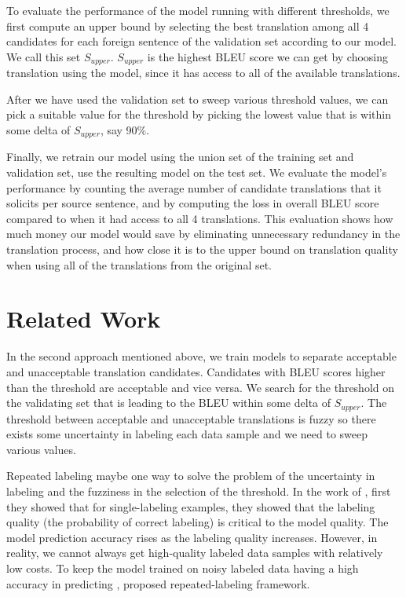 \documentclass[11pt]{article}
\begin{document}
To evaluate the performance of the model running with different thresholds, we first compute an upper bound by selecting the best translation among all 4 candidates for each foreign sentence of the validation set according to our  model. We call this set $S_{upper}$.  $S_{upper}$ is the highest BLEU score we can get by choosing translation using the model, since it has access to all of the available translations.  

After we have used the validation set to sweep various threshold values,  we can pick a suitable value for the threshold by picking the lowest value that is within some delta of $S_{upper}$, say  90$\%$. 

Finally, we retrain our model using the union set of the training set and validation set, use the resulting model on the test set.  We evaluate the model's performance by counting the average number of candidate translations that it solicits per source sentence, and by computing the loss in overall BLEU score compared to when it had access to all 4 translations.  This evaluation shows how much money our model would save by eliminating unnecessary redundancy in the translation process, and how close it is to the upper bound on translation quality when using all of the translations from the original set.

\section{Related Work}
In the second approach mentioned above, we train models to separate acceptable and unacceptable translation candidates. Candidates with BLEU scores higher than the threshold are acceptable and vice versa. We search for the threshold on the validating set that is leading to the BLEU within some delta of $S_{upper}$.  The threshold between acceptable and unacceptable translations is fuzzy so there exists some uncertainty in labeling each data sample and we need to sweep various values. 

Repeated labeling \cite{sheng2008get} maybe one way to solve the problem of the  uncertainty in labeling and the fuzziness in the selection of the threshold. In the work of \cite{sheng2008get}, first they showed that for single-labeling examples, they showed that the labeling quality (the probability of correct labeling) is critical to the model quality. The model prediction accuracy rises as the labeling quality increases. However, in reality, we cannot always get high-quality labeled data samples with relatively low costs. To keep the model trained on noisy labeled data having a high accuracy in predicting ,  proposed repeated-labeling framework. 
\end{document}
